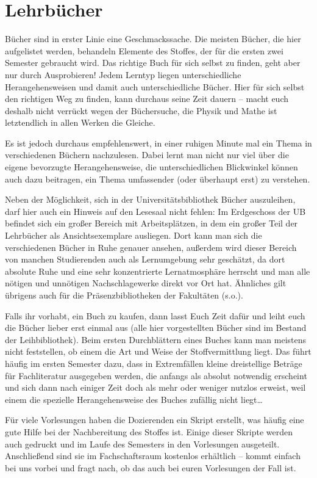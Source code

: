 \section{Lehrbücher}

Bücher sind in erster Linie eine Geschmackssache. Die meisten Bücher, die
hier aufgelistet werden, behandeln Elemente des Stoffes, der für die ersten
zwei Semester gebraucht wird. Das richtige Buch für sich selbst zu finden,
geht aber nur durch Ausprobieren! Jedem Lerntyp liegen unterschiedliche
Herangehensweisen und damit auch unterschiedliche Bücher. Hier für sich
selbst den richtigen Weg zu finden, kann durchaus seine Zeit dauern -- macht
euch deshalb nicht verrückt wegen der Büchersuche, die Physik und Mathe ist
letztendlich in allen Werken die Gleiche.

Es ist jedoch durchaus empfehlenswert, in einer ruhigen Minute mal ein Thema
in verschiedenen Büchern nachzulesen. Dabei lernt man nicht nur viel über die
eigene bevorzugte Herangehensweise, die unterschiedlichen Blickwinkel können
auch dazu beitragen, ein Thema umfassender (oder überhaupt erst) zu verstehen.

Neben der Möglichkeit, sich in der Universitätsbibliothek Bücher auszuleihen,
darf hier auch ein Hinweis auf den Lesesaal nicht fehlen: Im Erdgeschoss der UB
befindet sich ein großer Bereich mit Arbeitsplätzen, in dem ein großer Teil der
Lehrbücher als Ansichtsexemplare ausliegen.  Dort kann man sich die
verschiedenen Bücher in Ruhe genauer ansehen, außerdem wird dieser Bereich von
manchen Studierenden auch als Lernumgebung sehr geschätzt, da dort absolute
Ruhe und eine sehr konzentrierte Lernatmosphäre herrscht und man alle nötigen
und unnötigen Nachschlagewerke direkt vor Ort hat. Ähnliches gilt übrigens auch
für die Präsenzbibliotheken der Fakultäten (s.o.).

Falls ihr vorhabt, ein Buch zu kaufen, dann lasst Euch Zeit dafür und leiht euch
die Bücher lieber erst einmal aus (alle hier vorgestellten Bücher sind im Bestand
der Leihbibliothek). Beim ersten Durchblättern eines Buches kann man meistens
nicht feststellen, ob einem die Art und Weise der Stoffvermittlung liegt. Das
führt häufig im ersten Semester dazu, dass in Extremfällen kleine dreistellige
Beträge für Fachliteratur ausgegeben werden, die anfangs als absolut notwendig
erscheint und sich dann nach einiger Zeit doch als mehr oder weniger nutzlos
erweist, weil einem die spezielle Herangehensweise des Buches zufällig nicht liegt\dots

Für viele Vorlesungen haben die Dozierenden ein Skript erstellt, was häufig eine gute
Hilfe bei der Nachbereitung des Stoffes ist. Einige dieser Skripte werden auch gedruckt
und im Laufe des Semesters in den Vorlesungen ausgeteilt. Anschließend sind sie im 
Fachschaftsraum kostenlos erhältlich -- kommt einfach bei uns vorbei und fragt nach,
ob das auch bei euren Vorlesungen der Fall ist.

